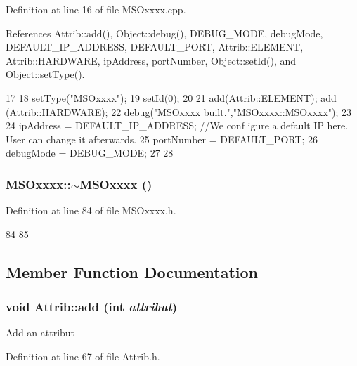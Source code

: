 Definition at line 16 of file MSOxxxx.cpp.

References Attrib::add(), Object::debug(), DEBUG\_\-MODE, debugMode, DEFAULT\_\-IP\_\-ADDRESS, DEFAULT\_\-PORT, Attrib::ELEMENT, Attrib::HARDWARE, ipAddress, portNumber, Object::setId(), and Object::setType().


\begin{DoxyCode}
17 {
18     setType("MSOxxxx");
19     setId(0);
20 
21     add(Attrib::ELEMENT); add (Attrib::HARDWARE);
22     debug("MSOxxxx built.","MSOxxxx::MSOxxxx");
23 
24     ipAddress   = DEFAULT_IP_ADDRESS;                                   //We conf
      igure a default IP here. User can change it afterwards.
25     portNumber  =   DEFAULT_PORT;
26     debugMode       = DEBUG_MODE;
27 
28 }
\end{DoxyCode}
\hypertarget{classMSOxxxx_a567c156d78fbeab9d61bf8ec9acac851}{
\subsubsection[{$\sim$MSOxxxx}]{\setlength{\rightskip}{0pt plus 5cm}MSOxxxx::$\sim$MSOxxxx ()}}
\label{classMSOxxxx_a567c156d78fbeab9d61bf8ec9acac851}


Definition at line 84 of file MSOxxxx.h.


\begin{DoxyCode}
84             {
85   }
\end{DoxyCode}


\subsection{Member Function Documentation}
\hypertarget{classAttrib_a235f773af19c900264a190b00a3b4ad7}{
\subsubsection[{add}]{\setlength{\rightskip}{0pt plus 5cm}void Attrib::add (int {\em attribut})}}
\label{classAttrib_a235f773af19c900264a190b00a3b4ad7}
Add an attribut 

Definition at line 67 of file Attrib.h.

